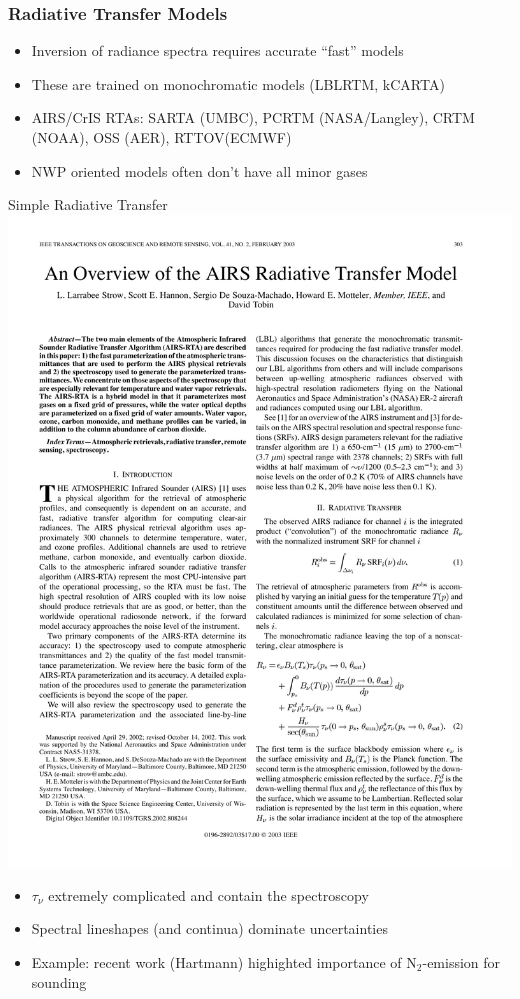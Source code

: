 \documentclass[10pt,t]{beamer}
\begin{document}
\begin{frame}
  \frametitle{Radiative Transfer Models}
  \begin{itemize}
  \item Inversion of radiance spectra requires accurate ``fast'' models
  \item These are trained on monochromatic models (LBLRTM, kCARTA)
  \item AIRS/CrIS RTAs:  SARTA (UMBC), PCRTM (NASA/Langley), CRTM (NOAA), OSS (AER), RTTOV(ECMWF)
  \item NWP oriented models often don't have all minor gases
  \end{itemize}
  \begin{block}{Simple Radiative Transfer}
    \centering \includegraphics[width=0.55\linewidth]{Figslls/simple_rta.pdf}
   \begin{small}
    \begin{itemize}
    \item $\tau_{\nu}$ extremely complicated and contain the spectroscopy
    \item Spectral lineshapes (and continua) dominate uncertainties
    \item Example: recent work (Hartmann) highighted importance of N$_2$-\water emission for sounding
    \end{itemize}
 \end{small}
  \end{block}
\end{frame}
\end{document}
